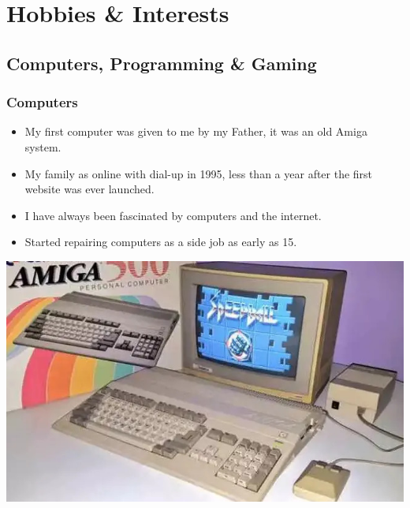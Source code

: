 \documentclass{beamer}
\begin{document}
	\section{Hobbies \& Interests}
		\subsection{Computers, Programming \& Gaming}
			\begin{frame}
	\frametitle{Computers}
\begin{itemize}
	\item My first computer was given to me by my Father, it was an old Amiga system.
	\item My family as online with dial-up in 1995, less than a year after the first website was ever launched.  
	\item I have always been fascinated by computers and the internet.
	\item Started repairing computers as a side job as early as 15.   
\end{itemize}
\begin{center}
	\includegraphics[width = 1.0\textwidth]{images/Amiga-Computer.jpg}
\end{center}
			\end{frame}
		
\end{document}
